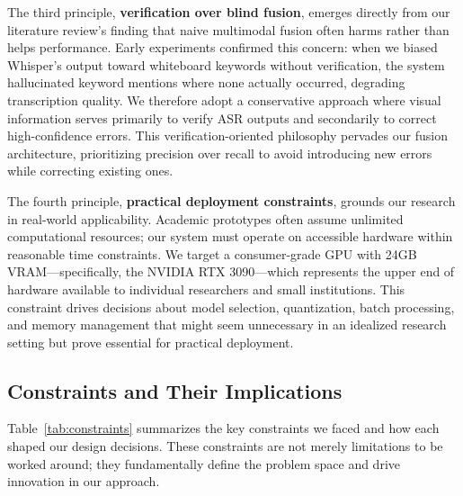 The third principle, \textbf{verification over blind fusion}, emerges directly from our literature review's finding that naive multimodal fusion often harms rather than helps performance. Early experiments confirmed this concern: when we biased Whisper's output toward whiteboard keywords without verification, the system hallucinated keyword mentions where none actually occurred, degrading transcription quality. We therefore adopt a conservative approach where visual information serves primarily to verify ASR outputs and secondarily to correct high-confidence errors. This verification-oriented philosophy pervades our fusion architecture, prioritizing precision over recall to avoid introducing new errors while correcting existing ones.

The fourth principle, \textbf{practical deployment constraints}, grounds our research in real-world applicability. Academic prototypes often assume unlimited computational resources; our system must operate on accessible hardware within reasonable time constraints. We target a consumer-grade GPU with 24GB VRAM---specifically, the NVIDIA RTX 3090---which represents the upper end of hardware available to individual researchers and small institutions. This constraint drives decisions about model selection, quantization, batch processing, and memory management that might seem unnecessary in an idealized research setting but prove essential for practical deployment.

\subsection{Constraints and Their Implications}

Table~\ref{tab:constraints} summarizes the key constraints we faced and how each shaped our design decisions. These constraints are not merely limitations to be worked around; they fundamentally define the problem space and drive innovation in our approach.

